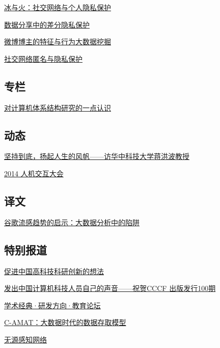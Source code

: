 \documentclass[a4paper]{article}
\begin{document}
\href{http://history.ccf.org.cn/resources/1190201776262/2014/06/13/6.pdf}{冰与火：社交网络与个人隐私保护}

\href{http://history.ccf.org.cn/resources/1190201776262/2014/06/13/8.pdf}{数据分享中的差分隐私保护}

\href{http://history.ccf.org.cn/resources/1190201776262/2014/06/13/7.pdf}{微博博主的特征与行为大数据挖掘}

\href{http://history.ccf.org.cn/resources/1190201776262/2014/06/13/9.pdf}{社交网络匿名与隐私保护}

\subsection{专栏}
\href{http://history.ccf.org.cn/resources/1190201776262/2014/06/13/11.pdf}{对计算机体系结构研究的一点认识}

\subsection{动态}
\href{http://history.ccf.org.cn/resources/1190201776262/2014/06/13/12.pdf}{坚持到底，扬起人生的风帆——访华中科技大学蒋洪波教授}

\href{http://history.ccf.org.cn/resources/1190201776262/2014/06/13/13.pdf}{2014 人机交互大会}

\subsection{译文}
\href{http://history.ccf.org.cn/resources/1190201776262/2014/06/13/14.pdf}{谷歌流感趋势的启示：大数据分析中的陷阱}

\subsection{特别报道}
\href{http://history.ccf.org.cn/resources/1190201776262/2014/06/11/1.pdf}{促进中国高科技科研创新的想法}

\href{http://history.ccf.org.cn/resources/1190201776262/2014/06/11/0.pdf}{发出中国计算机科技人员自己的声音——祝贺CCCF 出版发行100期}

\href{http://history.ccf.org.cn/resources/1190201776262/2014/06/11/2.pdf}{学术经典·研发方向·教育论坛}

\href{http://history.ccf.org.cn/resources/1190201776262/2014/06/11/3.pdf}{C-AMAT：大数据时代的数据存取模型}

\href{http://history.ccf.org.cn/resources/1190201776262/2014/06/11/4.pdf}{无源感知网络}
\end{document}
